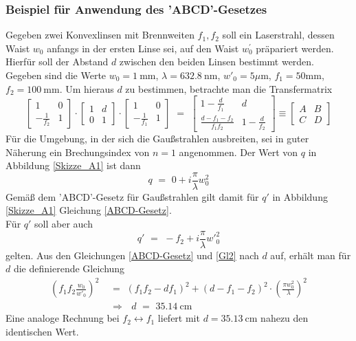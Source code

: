 \documentclass[11pt,a4paper,oneside]{scrartcl}
\begin{document}
\subsubsection{Beispiel für Anwendung des 'ABCD'-Gesetzes}
Gegeben zwei Konvexlinsen mit Brennweiten $f_1,f_2$ soll ein Laserstrahl, dessen Waist $w_0$ anfangs in der ersten Linse sei, auf den Waist $w_0^\prime$ präpariert werden. Hierfür soll der Abstand $d$ zwischen den beiden Linsen bestimmt werden.\\
Gegeben sind die Werte $w_0 = 1\ \mathrm{mm}$, $\lambda = 632.8\ \mathrm{nm}$, ${w'}_0 = 5 \mu \mathrm m$, $f_1 = 50\mathrm{mm}$, $f_2 = 100\ \mathrm{mm}$. Um hieraus $d$ zu bestimmen, betrachte man die Transfermatrix
\begin{equation}
\begin{bmatrix}
    1 & 0 \\
    -\frac{1}{f_2} & 1 
\end{bmatrix}
\cdot
 \begin{bmatrix}
    1 & d \\
    0 & 1 
\end{bmatrix}
\cdot
 \begin{bmatrix}
    1 & 0 \\
    -\frac{1}{f_1} & 1 
\end{bmatrix}
\,\,=\,\,
 \begin{bmatrix}
   1-\frac{d}{f_1} & d \\
    \frac{d-f_1-f_2}{f_1 f_2} & 1-\frac{d}{f_2} 
\end{bmatrix}
\equiv
 \begin{bmatrix}
   A & B \\
    C & D 
\end{bmatrix}
\end{equation}
Für die Umgebung, in der sich die Gaußstrahlen ausbreiten, sei in guter Näherung ein Brechungsindex von $n=1$ angenommen. Der Wert von $q$ in Abbildung \ref{Skizze_A1} ist dann
\begin{equation}
q \,\,=\,\, 0 + i \frac{\pi}{\lambda} w_{0}^2
\end{equation}
Gemäß dem 'ABCD'-Gesetz für Gaußstrahlen gilt damit für $q'$ in Abbildung \ref{Skizze_A1} Gleichung \ref{ABCD-Gesetz}.\\
Für $q'$ soll aber auch
\begin{equation}\label{Gl2}
q' \,\,=\,\, -f_2 + i \frac{\pi}{\lambda} {w'}_{0}^{2}
\end{equation}
gelten. Aus den Gleichungen \ref{ABCD-Gesetz} und \ref{Gl2} nach $d$ auf, erhält man für $d$ die definierende Gleichung
\begin{align}
\left( f_1 f_2 \frac{w_0}{{w'}_{0}} \right)^2 \,\,&=\,\, \left( f_1 f_2 - d f_1 \right)^2 + \left( d - f_1 - f_2 \right)^2 \cdot \left(\frac{\pi w_{0}^{2}}{\lambda} \right)^2\\ \quad&
\Rightarrow \,\,\,\, d \,\,=\,\, 35.14\ \mathrm{cm}
\end{align}
Eine analoge Rechnung bei $f_2\leftrightarrow f_1$ liefert mit $d=35.13\ \mathrm{cm}$ nahezu den identischen Wert.
\end{document}

